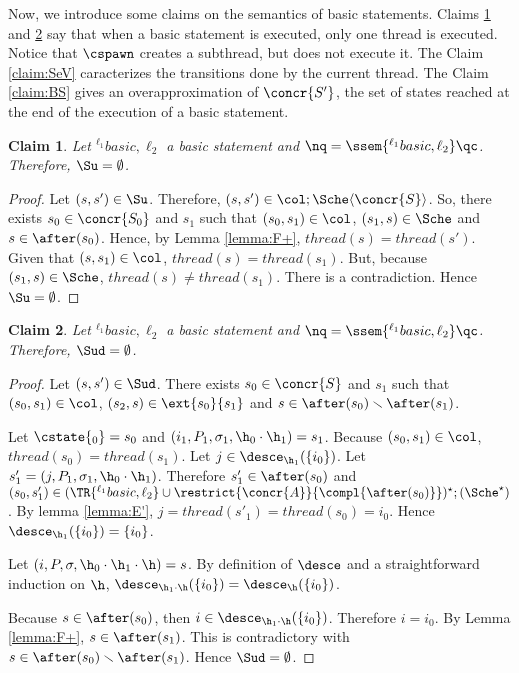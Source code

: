 \documentclass[12pt]{article}
\let\vide\emptyset \let\appartient\in
\let\firstunion\cup
\let\emptyset\vide \let\in\appartient
\let\cup\firstunion
\newcommand{\li}[1]{ {}^{\ell_{#1}}  }
\newcommand{\thread}{\mathit{thread}}
\newtheorem{claim}{Claim}
\begin{document}
Now, we introduce some claims on the semantics of basic statements.
Claims \ref{claim:SuV} and \ref{claim:SudV} say that when a basic statement is executed, only one thread is executed. Notice that \(\cspawn\) creates a subthread, but does not execute it.
The Claim \ref{claim:SeV}  caracterizes the transitions done by the current thread. The Claim \ref{claim:BS} gives an overapproximation of \(\concr{S'}\), the set of states reached at the end of the execution of a basic statement.


\begin{claim}\label{claim:SuV}
 Let \(\li1 basic,\ell_2\) a basic statement and \(\nq=\ssem{\li1 basic,\ell_2}\qc\).
 Therefore, \(\Su=\emptyset\).
 \end{claim}
\begin{proof}
Let \((s,s')\in\Su\).
Therefore, \((s,s')\in\col;\Sche\langle \concr{S} \rangle\).
So, there exists \(s_0\in\concr{S_0}\) and \(s_1\) such that \((s_0,s_1)\in\col\), \((s_1,s)\in\Sche\) and \(s\in\after(s_0)\).
Hence, by Lemma \ref{lemma:F+}, \(\thread(s)=\thread(s')\).
Given that \((s,s_1)\in\col\), \(\thread(s)=\thread(s_1)\).
But, because \((s_1,s)\in\Sche\), \(\thread(s)\neq\thread(s_1)\).
There is a contradiction. Hence \(\Su=\emptyset\).
\end{proof}


\begin{claim}\label{claim:SudV}
 Let \(\li1 basic,\ell_2\) a basic statement and \(\nq=\ssem{\li1 basic,\ell_2}\qc\).
 Therefore, \(\Sud=\emptyset\).
 \end{claim}
\begin{proof}
 Let \((s,s')\in\Sud\). There exists \(s_0\in\concr{S}\) and \(s_1\) such that \((s_0,s_1)\in\col\), \((s_2,s)\in\ext{s_0}{s_1}\) and \(s\in\after(s_0)\smallsetminus\after(s_1)\).
 
Let \(\cstate{_0}=s_0\) and \((i_1,P_1,\m_1,\h_0\cdot\h_1)=s_1\).
Because \((s_0,s_1)\in\col\), \(\thread(s_0)=\thread(s_1)\).
Let \(j\in\desce_{\h_1}(\{i_0\})\). Let \(s'_1=(j,P_1,\m_1,\h_0\cdot\h_1)\).
Therefore \(s'_1\in \after(s_0)\) and \((s_0,s'_1)\in (\TR{\li1 basic,\ell_2}\cup\restrict{\concr{A}}{\compl{\after(s_0)}})^{\star};(\Sche^{\star})\).
By lemma \ref{lemma:E'}, \(j=\thread(s'_1)=\thread(s_0)=i_0\).
Hence \(\desce_{\h_1}(\{i_0\})=\{i_0\}\).

Let \((i,P,\m,\h_0\cdot\h_1\cdot\h)=s\). By definition of \(\desce\) and a straightforward induction on \(\h\), \(\desce_{\h_1\cdot\h}(\{i_0\})=\desce_{\h}(\{i_0\})\).

Because \(s\in\after(s_0)\), then \(i\in \desce_{\h_1\cdot\h}(\{i_0\})\). Therefore \(i=i_0\). By Lemma \ref{lemma:F+}, \(s\in\after(s_1)\). This is contradictory with \(s\in\after(s_0)\smallsetminus\after(s_1)\).
Hence \(\Sud=\emptyset\).
\end{proof}
\end{document}
